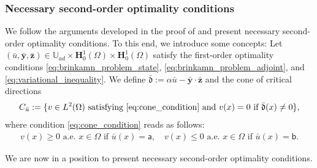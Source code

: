 \documentclass[final]{siamart0216}
\begin{document}
\subsubsection{Necessary second-order optimality conditions}

We follow the arguments developed in the proof of \cite[Theorem 23]{MR3586845} and present necessary second-order optimality conditions. To this end, we introduce some concepts: Let $(\bar{u},\bar{\mathbf{y}},\bar{\mathbf{z}})\in\mathbb{U}_{ad}\times \mathbf{H}_0^1(\Omega)\times \mathbf{H}_0^1(\Omega)$ satisfy the first-order optimality conditions \eqref{eq:brinkamn_problem_state}, \eqref{eq:brinkamn_problem_adjoint}, and \eqref{eq:variational_inequality}. We define $\bar{\mathfrak{d}}:=\alpha\bar{u}-\bar{\mathbf{y}}\cdot\bar{\mathbf{z}}$ and the cone of critical directions
\begin{align}\label{eq:cone}
C_{\bar{u}}:=\{v\in L^{2}(\Omega) \text{ satisfying } \eqref{eq:cone_condition} \text{ and } v(x)=0 \text{ if } \bar{\mathfrak{d}}(x)\neq 0\},
\end{align}
where condition \eqref{eq:cone_condition} reads as follows:
\begin{align}\label{eq:cone_condition}
v(x)\geq 0 \text{ a.e. } x\in\Omega	\text{ if } \bar{u}(x)=\mathsf{a},\quad v(x)\leq 0 \text{ a.e. } x\in\Omega	\text{ if } \bar{u}(x)= \mathsf{b}.
\end{align}

We are now in a position to present necessary second-order optimality conditions.
\end{document}
